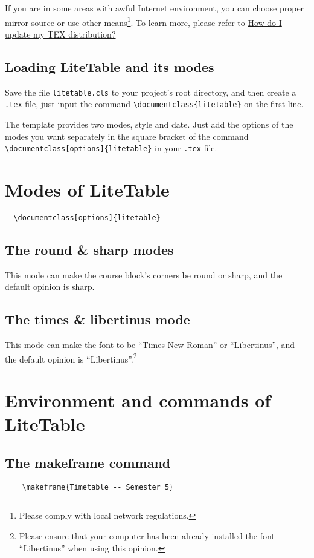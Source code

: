 \documentclass[11pt]{article}
\makeatletter
\def\@pkg#1{\texorpdfstring{\href{https://www.ctan.org/pkg/#1}%
{\textcolor{pkgcolor}{\textsf{#1}}}}{“#1”}}
\def\s@pkg#1{\texorpdfstring{\textcolor{pkgcolor}{\textsf{#1}}}{“#1”}}
\DeclareRobustCommand\pkg{\@ifstar\s@pkg\@pkg}
\def\mode#1{\texorpdfstring{\textcolor{moducolor}{\textsf{#1}}}{“#1”}}
\def\cmd#1{\texorpdfstring{\textcolor{cmdcolor}{\textsf{#1}}}{“#1”}}
\makeatother
\begin{document}
If you are in some areas with awful Internet environment, you can choose proper mirror source or use other means\footnote{Please comply with local network regulations.}. To learn more, please refer to \href{https://tex.stackexchange.com/questions/55437/how-do-i-update-my-tex-distribution}{How do I update my TEX distribution?}

\subsection{Loading \pkg{LiteTable} and its modes}
Save the file \verb|litetable.cls| to your project's root directory, and then create a \verb|.tex| file, just input the command \verb|\documentclass{litetable}| on the first line.

The template provides two modes, \mode{style} and \mode{date}. Just add the options of the modes you want separately in the square bracket of the command \verb|\documentclass[options]{litetable}| in your \verb|.tex| file.

\section{Modes of \pkg{LiteTable}}
\begin{verbatim}
  \documentclass[options]{litetable}
\end{verbatim}
\subsection{The \mode{round} \& \mode{sharp} modes}
This mode can make the course block's corners be round or sharp, and the default opinion is sharp.
\subsection{The \mode{times} \& \mode{libertinus} mode}
This mode can make the font to be ``Times New Roman'' or ``Libertinus'', and the default opinion is ``Libertinus''.\footnote{Please ensure that your computer has been already installed the font ``Libertinus'' when using this opinion.}

\section{Environment and commands of \pkg{LiteTable}}

\subsection{The \cmd{makeframe} command}
\begin{verbatim}
    \makeframe{Timetable -- Semester 5}
\end{verbatim}
\end{document}
